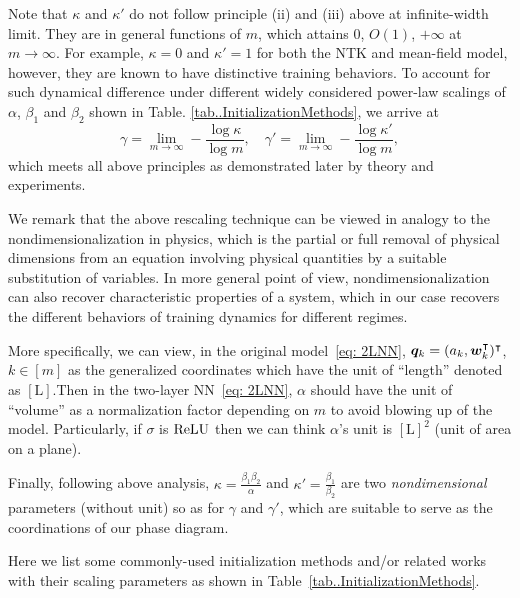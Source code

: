 \documentclass{article}
\begin{document}
Note that $\kappa$ and $\kappa'$ do not follow principle (ii) and (iii) above at infinite-width limit. They are in general functions of $m$, which attains $0$, $O(1)$, $+\infty$ at $m\to\infty$. For example, $\kappa=0$ and $\kappa'=1$ for both the NTK and mean-field model, however, they are known to have distinctive training behaviors. To account for such dynamical difference under different widely considered power-law scalings of $\alpha$, $\beta_1$ and $\beta_2$ shown in Table. \ref{tab..InitializationMethods}, we arrive at
\begin{equation}
    \gamma=\lim_{m\to\infty}-\frac{\log \kappa}{\log m}, \quad \gamma'=\lim_{m\to\infty}-\frac{\log\kappa'}{\log m},
\end{equation}
which meets all above principles as demonstrated later by theory and experiments.

\begin{rmk}
    We remark that the above rescaling technique can be viewed in analogy to the nondimensionalization in physics, which is the partial or full removal of physical dimensions from an equation involving physical quantities by a suitable substitution of variables. In more general point of view, nondimensionalization can also recover characteristic properties of a system, which in our case recovers the different behaviors of training dynamics for different regimes.

    More specifically, we can view, in the original model~\eqref{eq: 2LNN}, $\bm{q}_k=(a_k,\bm{w}_k^{\intercal})^\intercal$, $k\in[m]$ as the generalized coordinates which have the unit of ``length'' denoted as $[\mathrm{L}]$.\@ Then in the two-layer NN~\eqref{eq: 2LNN}, $\alpha$ should have the unit of ``volume'' as a normalization factor depending on $m$ to avoid blowing up of the model. Particularly, if $\sigma$ is $\mathrm{ReLU}$ then we can think $\alpha$'s unit is $[\mathrm{L}]^2$ (unit of area on a plane).

    Finally, following above analysis, $\kappa=\frac{\beta_1\beta_2}{\alpha}$ and $\kappa'=\frac{\beta_1}{\beta_2}$ are two \emph{nondimensional} parameters (without unit) so as for $\gamma$ and $\gamma'$, which are suitable to serve as the coordinations of our phase diagram.
\end{rmk}
\begin{rmk}
    Here we list some commonly-used initialization methods and/or related works with their scaling parameters as shown in Table~\ref{tab..InitializationMethods}.
\end{rmk}
\end{document}
